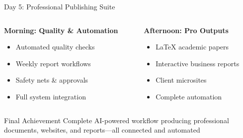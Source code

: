 \documentclass{beamer}
\begin{document}
\begin{frame}{Day 5: Professional Publishing Suite}
\begin{columns}[T]
\begin{column}{0.5\textwidth}
\textbf{Morning: Quality \& Automation}
\begin{itemize}
\item Automated quality checks
\item Weekly report workflows
\item Safety nets \& approvals
\item Full system integration
\end{itemize}
\end{column}
\begin{column}{0.5\textwidth}
\textbf{Afternoon: Pro Outputs}
\begin{itemize}
\item LaTeX academic papers
\item Interactive business reports
\item Client microsites
\item Complete automation
\end{itemize}
\end{column}
\end{columns}
\vspace{1em}
\begin{alertblock}{Final Achievement}
Complete AI-powered workflow producing professional documents, websites, and reports—all connected and automated
\end{alertblock}
\end{frame}
\end{document}
